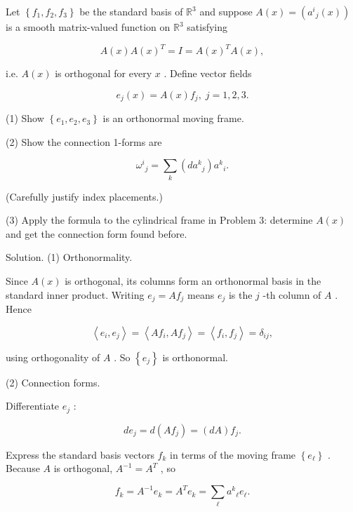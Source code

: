 \documentclass[10pt]{article}
\begin{document}
\begin{problem}[title=PROBLEM 5 (5 POINTS)]
Let \(\left\{  {{f}_{1},{f}_{2},{f}_{3}}\right\}\) be the standard basis of \({\mathbb{R}}^{3}\) and suppose \(A\left( x\right)  = \left( {{a}^{i}{}_{j}\left( x\right) }\right)\) is a smooth matrix-valued function on \({\mathbb{R}}^{3}\) satisfying

\[
A\left( x\right) A{\left( x\right) }^{T} = I = A{\left( x\right) }^{T}A\left( x\right) ,
\]

i.e. \(A\left( x\right)\) is orthogonal for every \(x\) . Define vector fields

\[
{e}_{j}\left( x\right)  = A\left( x\right) {f}_{j},\;j = 1,2,3.
\]

(1) Show \(\left\{  {{e}_{1},{e}_{2},{e}_{3}}\right\}\) is an orthonormal moving frame.

(2) Show the connection 1-forms are

\[
{\omega }^{i}{}_{j} = \mathop{\sum }\limits_{k}\left( {d{a}^{k}{}_{j}}\right) {a}^{k}{}_{i}.
\]

(Carefully justify index placements.)

(3) Apply the formula to the cylindrical frame in Problem 3: determine \(A\left( x\right)\) and get the connection form found before.
\end{problem}

Solution. (1) Orthonormality.

Since \(A\left( x\right)\) is orthogonal, its columns form an orthonormal basis in the standard inner product. Writing \({e}_{j} = A{f}_{j}\) means \({e}_{j}\) is the \(j\) -th column of \(A\) . Hence

\[
\left\langle  {{e}_{i},{e}_{j}}\right\rangle   = \left\langle  {A{f}_{i},A{f}_{j}}\right\rangle   = \left\langle  {{f}_{i},{f}_{j}}\right\rangle   = {\delta }_{ij},
\]

using orthogonality of \(A\) . So \(\left\{  {e}_{j}\right\}\) is orthonormal.

(2) Connection forms.

Differentiate \({e}_{j}\) :

\[
d{e}_{j} = d\left( {A{f}_{j}}\right)  = \left( {dA}\right) {f}_{j}.
\]

Express the standard basis vectors \({f}_{k}\) in terms of the moving frame \(\left\{  {e}_{\ell }\right\}\) . Because \(A\) is orthogonal, \({A}^{-1} = {A}^{T}\) , so

\[
{f}_{k} = {A}^{-1}{e}_{k} = {A}^{T}{e}_{k} = \mathop{\sum }\limits_{\ell }{a}^{k}{}_{\ell }{e}_{\ell }.
\]
\end{document}
